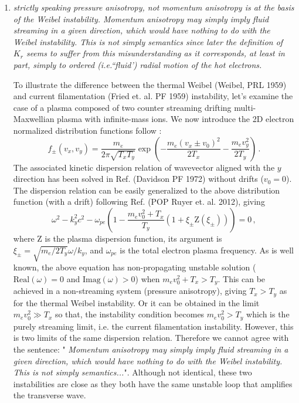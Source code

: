 \documentclass{article}
\begin{document}
\begin{enumerate}
\item \textit{strictly speaking pressure anisotropy, not momentum anisotropy is at the basis of the Weibel instability. Momentum anisotropy may simply imply fluid streaming in a given direction, which would have nothing to do with the Weibel instability. This is not simply semantics since later the definition of $K_r$ seems to suffer from this misunderstanding as it corresponds, at least in part, simply to ordered (i.e.``fluid') radial motion of the hot electrons. }

To illustrate the difference between the thermal Weibel (Weibel, PRL 1959) and current filamentation (Fried et. al. PF 1959) instability, let's examine the case of a plasma composed of two counter streaming drifting multi-Maxwellian plasma with infinite-mass ions.
We now introduce the 2D electron normalized  distribution functions follow :
 \begin{equation}
f_{ \pm}(v_x, v_y)  = \frac{ m_e }{2 \pi \sqrt{  T_x T_y  } }\exp\left( -\frac{ m_e (v_x \pm v_0)^2 }{ 2T_x }  -  \frac{ m_e v_y^2 }{ 2 T_y }\right) \, .
 \end{equation}
The associated kinetic dispersion relation of wavevector aligned with the $y$ direction has been solved in Ref.  (Davidson PF 1972) without drifts ($v_0=0$). The dispersion relation can be easily generalized to the above distribution function (with a drift)
following Ref. (POP Ruyer et. al. 2012),  giving
 \begin{equation}
 \omega^2 -k_y^2c^2 -  \omega_{pe}\left( 
1 -  \frac{ m_e v_0^2  + T_x }{ T_y }  ( 1 +\xi_\pm \mathrm{ Z }(\xi_\pm)  ) 
\right) =0 \, ,
 \end{equation}
where $ \mathrm{ Z }$ is the plasma dispersion function, its argument is $\xi_\pm =\sqrt{  m_e/2 T_y  }   \omega/k_y$, and 
$\omega_{pe}$ is the total electron plasma frequency. As is well known, the above equation has non-propagating unstable solution ($\mathrm{Real}(\omega)=0$ and $\mathrm{Imag}(\omega)>0$) when $m_e v_0^2  + T_x > T_y$.
This can be achieved in a non-streaming system (pressure anisotropy), giving $T_x > T_y$ as for the thermal Weibel instability. 
Or it can be obtained in the limit $m_e v_0^2  \gg T_x$ so that, the instability condition becomes  $m_e v_0^2  > T_y$ which is the purely streaming limit, i.e.  the current filamentation instability.
However, this is two limits of the same dispersion relation. Therefore we cannot agree with the sentence: " \textit{Momentum anisotropy may simply imply fluid streaming in a given direction, which would have nothing to do with the Weibel instability. This is not simply semantics...}". 
Although not identical, these two instabilities are   close as they both   have the same unstable loop that amplifies the transverse wave.


\end{enumerate}
\end{document}
